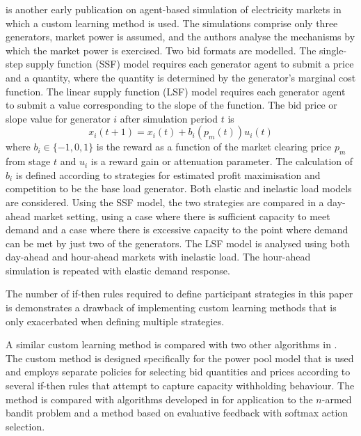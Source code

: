  is another early publication on agent-based simulation of
electricity markets in which a custom learning method is used.  The simulations
comprise only three generators, market power is assumed, and the authors analyse
the mechanisms by which the market power is exercised.  Two bid formats are
modelled.  The single-step supply function (SSF) model requires each generator
agent to submit a price and a quantity, where the quantity is determined by the
generator's marginal cost function.  The linear supply function (LSF) model
requires each generator agent to submit a value corresponding to the slope of
the function.  The bid price or slope value for generator $i$ after simulation
period $t$ is
\begin{equation}
x_i(t+1) = x_i(t) + b_i (p_m(t)) u_i(t)
\end{equation}
where $b_i \in \lbrace-1,0,1\rbrace$ is the reward as a function of the market
clearing price $p_m$ from stage $t$ and $u_i$ is a reward gain or attenuation
parameter.  The calculation of $b_i$ is defined according to strategies for
estimated profit maximisation and competition to be the base load generator.
Both elastic and inelastic load models are considered.  Using the SSF
model, the two strategies are compared in a day-ahead market setting,
using a case where there is sufficient capacity to meet demand and a case where
there is excessive capacity to the point where demand can be met by just two of
the generators.  The LSF model is analysed using both day-ahead and
hour-ahead markets with inelastic load.  The hour-ahead simulation is repeated
with elastic demand response.

The number of if-then rules required to define participant strategies in this
paper is demonstrates a drawback of implementing custom learning methods that is
only exacerbated when defining multiple strategies.

A similar custom learning method is compared with two other algorithms in
.  The custom method is designed specifically for the power
pool model that is used and employs separate policies for selecting bid
quantities and prices according to several if-then rules that attempt to capture
capacity withholding behaviour.  The method is compared with algorithms
developed in  for application to the $n$-armed bandit problem
\cite[\S2.1]{robbins:53,suttonbarto:1998} and a method based on evaluative
feedback with softmax action selection.

